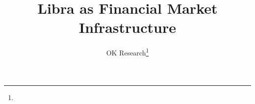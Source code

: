 \documentclass[lang=cn,headings=optiontohead]{elegantpaper}
\title{Libra as Financial Market Infrastructure}
\author{OK Research\thanks{}}
\begin{document}
\maketitle

%




%



\pagebreak
%



\pagebreak
\end{document}
